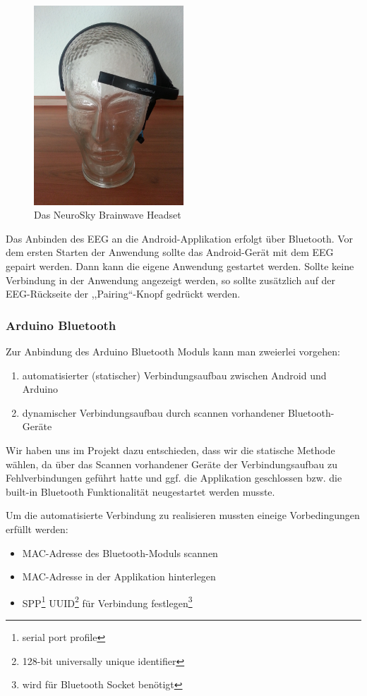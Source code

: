 \documentclass[10pt, a4paper, oneside, titlepage]{scrartcl} %
\begin{document}
	\begin{figure}[h!btp]
	\centering
	\includegraphics[width=0.5\textwidth]{implementierung_neuroskyheadset.jpg}
	\caption{Das NeuroSky Brainwave Headset}
	\label{fig:Brainwave-Headset}
	\end{figure}
	
	Das Anbinden des EEG an die Android-Applikation erfolgt über Bluetooth. Vor dem ersten Starten der Anwendung sollte das Android-Gerät mit dem EEG gepairt werden. Dann kann die eigene Anwendung gestartet werden. Sollte keine Verbindung in der Anwendung angezeigt werden, so sollte zusätzlich auf der EEG-Rückseite der ,,Pairing``-Knopf gedrückt werden.
	
	\subsubsection{Arduino Bluetooth}
			
	Zur Anbindung des Arduino Bluetooth Moduls kann man zweierlei vorgehen:
	\begin{enumerate}
	\item automatisierter (statischer) Verbindungsaufbau zwischen Android und Arduino
	\item dynamischer Verbindungsaufbau durch scannen vorhandener Bluetooth-Geräte
	\end{enumerate}
	
	Wir haben uns im Projekt dazu entschieden, dass wir die statische Methode wählen, da über das Scannen vorhandener Geräte der Verbindungsaufbau zu Fehlverbindungen geführt hatte und ggf. die Applikation geschlossen bzw. die built-in Bluetooth Funktionalität neugestartet werden musste. 
	
	Um die automatisierte Verbindung zu realisieren mussten eineige Vorbedingungen erfüllt werden:
	\begin{itemize}
	\item MAC-Adresse des Bluetooth-Moduls scannen
	\item MAC-Adresse in der Applikation hinterlegen
	\item SPP\footnote{serial port profile} UUID\footnote{128-bit universally unique identifier} für Verbindung festlegen\footnote{wird für Bluetooth Socket benötigt}
	\end{itemize}
	
\end{document}
